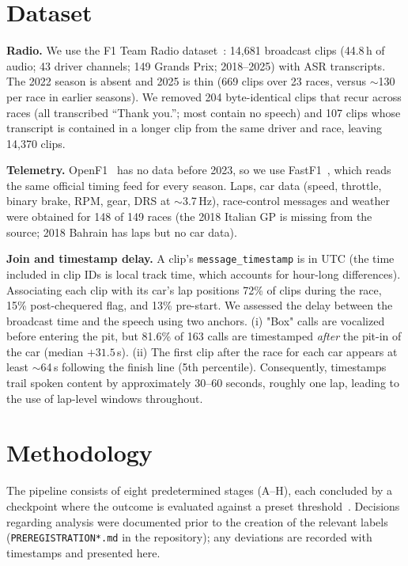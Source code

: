 \section{Dataset}
\label{sec:data}

\textbf{Radio.} We use the F1 Team Radio dataset~\cite{ciletti2025f1radio}: 14{,}681 broadcast clips (44.8\,h of audio; 43 driver channels; 149 Grands Prix; 2018--2025) with ASR transcripts. The 2022 season is absent and 2025 is thin (669 clips over 23 races, versus $\sim$130 per race in earlier seasons). We removed 204 byte-identical clips that recur across races (all transcribed ``Thank you.''; most contain no speech) and 107 clips whose transcript is contained in a longer clip from the same driver and race, leaving 14{,}370 clips.

\textbf{Telemetry.} OpenF1~\cite{openf1} has no data before 2023, so we use FastF1~\cite{fastf1}, which reads the same official timing feed for every season. Laps, car data (speed, throttle, binary brake, RPM, gear, DRS at $\sim$3.7\,Hz), race-control messages and weather were obtained for 148 of 149 races (the 2018 Italian GP is missing from the source; 2018 Bahrain has laps but no car data).

\textbf{Join and timestamp delay.} A clip's \texttt{message\_timestamp} is in UTC (the time included in clip IDs is local track time, which accounts for hour-long differences). Associating each clip with its car's lap positions 72\% of clips during the race, 15\% post-chequered flag, and 13\% pre-start. We assessed the delay between the broadcast time and the speech using two anchors. (i) "Box" calls are vocalized before entering the pit, but 81.6\% of 163 calls are timestamped \emph{after} the pit-in of the car (median $+31.5$\,s). (ii) The first clip after the race for each car appears at least $\sim$64\,s following the finish line (5th percentile). Consequently, timestamps trail spoken content by approximately 30–60 seconds, roughly one lap, leading to the use of lap-level windows throughout.


\section{Methodology}
\label{sec:method}

The pipeline consists of eight predetermined stages (A--H), each concluded by a checkpoint where the outcome is evaluated against a preset threshold~\cite{nosek2018prereg}. Decisions regarding analysis were documented prior to the creation of the relevant labels (\texttt{PREREGISTRATION*.md} in the repository); any deviations are recorded with timestamps and presented here.


